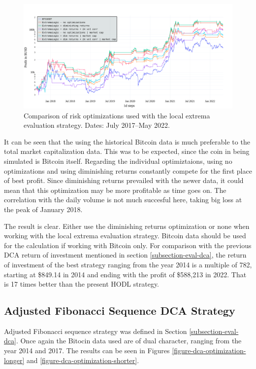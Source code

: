 \begin{figure}[!hbt]
    \centering
    \includegraphics[width=\columnwidth]{figures/evaluation-optimization-shorter.pdf}
    \caption{Comparison of risk optimizations used with the local extrema evaluation strategy. Dates: July 2017--May 2022.}
    \label{figure-optimization-shorter}
\end{figure}

It can be seen that the using the historical Bitcoin data is much preferable to the total market capitalization data. This was to be expected, since the coin in being simulated is Bitcoin itself. Regarding the individual optimiztaions, using no optimizations and using diminishing returns constantly compete for the first place of best profit. Since diminishing returns prevailed with the newer data, it could mean that this optimization may be more profitable as time goes on. The correlation with the daily volume is not much succesful here, taking big loss at the peak of January 2018.

The result is clear. Either use the diminishing returns optimization or none when working with the local extrema evaluation strategy. Bitcoin data should be used for the calculation if working with Bitcoin only. For comparison with the previous DCA return of investment mentioned in section \ref{subsection-eval-dca}, the return of investment of the best strategy ranging from the year 2014 is a multiple of 782, starting at \$849.14 in 2014 and ending with the profit of \$588,213 in 2022. That is 17 times better than the present HODL strategy.

\subsection*{Adjusted Fibonacci Sequence DCA Strategy}
Adjusted Fibonacci sequence strategy was defined in Section \ref{subsection-eval-dca}. Once again the Bitocin data used are of dual character, ranging from the year 2014 and 2017. The results can be seen in Figures \ref{figure-dca-optimization-longer} and \ref{figure-dca-optimization-shorter}.

